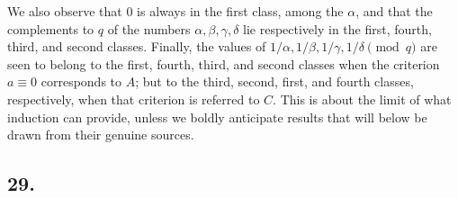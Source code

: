 \documentclass[12pt]{article}
\begin{document}
We also observe that $0$ is always in the first class, among the $\alpha$, and that the complements to $q$ of the numbers $\alpha,\beta,\gamma,\delta$ lie respectively in the first, fourth, third, and second classes. Finally, the values of $1/\alpha,1/\beta,1/\gamma,1/\delta\pmod q$ are seen to belong to the first, fourth, third, and second classes when the criterion $a\equiv0$ corresponds to $A$; but to the third, second, first, and fourth classes, respectively, when that criterion is referred to $C$. This is about the limit of what induction can provide, unless we boldly anticipate results that will below be drawn from their genuine sources.

\subsection*{29.}
\end{document}
